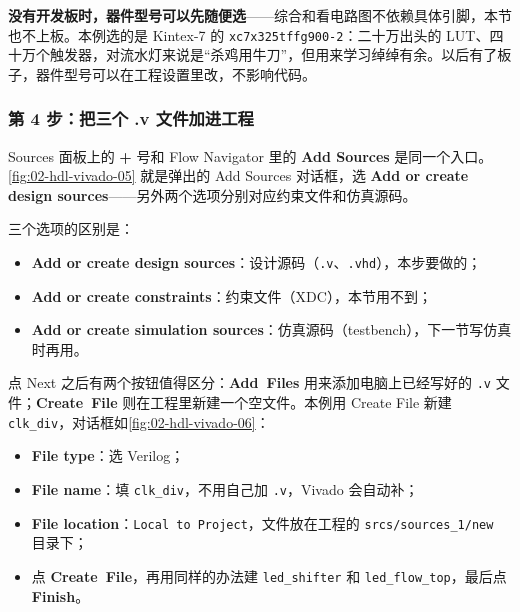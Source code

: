 \textbf{没有开发板时，器件型号可以先随便选}——综合和看电路图不依赖具体引脚，本节也不上板。本例选的是 Kintex-7 的 \texttt{xc7x325tffg900-2}：二十万出头的 LUT、四十万个触发器，对流水灯来说是“杀鸡用牛刀”，但用来学习绰绰有余。以后有了板子，器件型号可以在工程设置里改，不影响代码。

\subsubsection*{第 4 步：把三个 .v 文件加进工程}

Sources 面板上的 \textbf{+} 号和 Flow Navigator 里的 \textbf{Add Sources} 是同一个入口。\cref{fig:02-hdl-vivado-05} 就是弹出的 Add Sources 对话框，选 \textbf{Add or create design sources}——另外两个选项分别对应约束文件和仿真源码。


三个选项的区别是：

\begin{itemize}
  \item \textbf{Add or create design sources}：设计源码（\texttt{.v}、\texttt{.vhd}），本步要做的；
  \item \textbf{Add or create constraints}：约束文件（XDC），本节用不到；
  \item \textbf{Add or create simulation sources}：仿真源码（testbench），下一节写仿真时再用。
\end{itemize}

点 Next 之后有两个按钮值得区分：\mbox{\textbf{Add Files}} 用来添加电脑上已经写好的 \texttt{.v} 文件；\mbox{\textbf{Create File}} 则在工程里新建一个空文件。本例用 Create File 新建 \texttt{clk\_div}，对话框如\cref{fig:02-hdl-vivado-06}：


\begin{itemize}
  \item \textbf{File type}：选 Verilog；
  \item \textbf{File name}：填 \texttt{clk\_div}，不用自己加 \texttt{.v}，Vivado 会自动补；
  \item \textbf{File location}：\texttt{Local to Project}，文件放在工程的 \texttt{srcs/sources\_1/new} 目录下；
  \item 点 \mbox{\textbf{Create File}}，再用同样的办法建 \texttt{led\_shifter} 和 \texttt{led\_flow\_top}，最后点 \mbox{\textbf{Finish}}。
\end{itemize}

